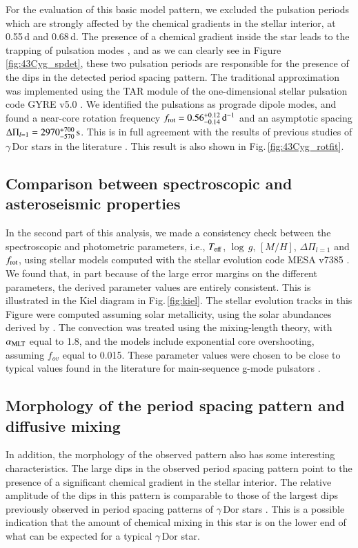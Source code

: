 \documentclass{aa}
\begin{document}
For the evaluation of this basic model pattern, we excluded the pulsation periods which are strongly affected by the chemical gradients in the stellar interior, at 0.55\,d and 0.68\,d.  The presence of a chemical gradient inside the star leads to the trapping of pulsation modes \citep{miglio2008}, and as we can clearly see in Figure\,\ref{fig:43Cyg_spdet}, these two pulsation periods are responsible for the presence of the dips in the detected period spacing pattern. The traditional approximation was implemented using the TAR module of the one-dimensional stellar pulsation code GYRE v5.0 \citep{townsend2013}. We identified the pulsations as prograde dipole modes, and found a near-core rotation frequency $f_{\rm rot} = 0.56^{+0.12}_{-0.14}\,\rm d^{-1}$ and an asymptotic spacing $\Delta \Pi_{l=1} = 2970^{+700}_{-570}\,\rm s$. This is in full agreement with the results of previous studies of $\gamma$\,Dor stars in the literature \citep[e.g.,][]{vanreeth2016,ouazzani2017}. This result is also shown in Fig.\,\ref{fig:43Cyg_rotfit}.



\subsection{Comparison between spectroscopic and asteroseismic properties}
\label{comparison}
In the second part of this analysis, we made a consistency check between the spectroscopic and photometric parameters, i.e., $T_{\rm eff}$, $\log\,g$, $[M/H]$, $\Delta\Pi_{l=1}$ and $f_{\rm rot}$, using stellar models computed with the stellar evolution code MESA v7385 \citep{paxton2011,paxton2013,paxton2015}. We found that, in part because of the large error margins on the different parameters, the derived parameter values are entirely consistent. This is illustrated in the Kiel diagram in Fig.\,\ref{fig:kiel}. The stellar evolution tracks in this Figure were computed assuming solar metallicity, using the solar abundances derived by \citet{asplund2009}. The convection was treated using the mixing-length theory, with $\alpha_{\rm MLT}$ equal to 1.8, and the models include exponential core overshooting, assuming $f_{ov}$ equal to 0.015. These parameter values were chosen to be close to typical values found in the literature for main-sequence g-mode pulsators \citep[e.g.,][]{moravveji2015,moravveji2016,schmidaerts2016}.


\subsection{Morphology of the period spacing pattern and diffusive mixing}
In addition, the morphology of the observed pattern also has some interesting characteristics. The large dips in the observed period spacing pattern point to the presence of a significant chemical gradient in the stellar interior. The relative amplitude of the dips in this pattern is comparable to those of the largest dips previously observed in period spacing patterns of $\gamma$\,Dor stars \citep[e.g.,][]{bedding2015,vanreeth2015apjs}. This is a possible indication that the amount of chemical mixing in this star is on the lower end of what can be expected for a typical $\gamma$\,Dor star.
\end{document}
